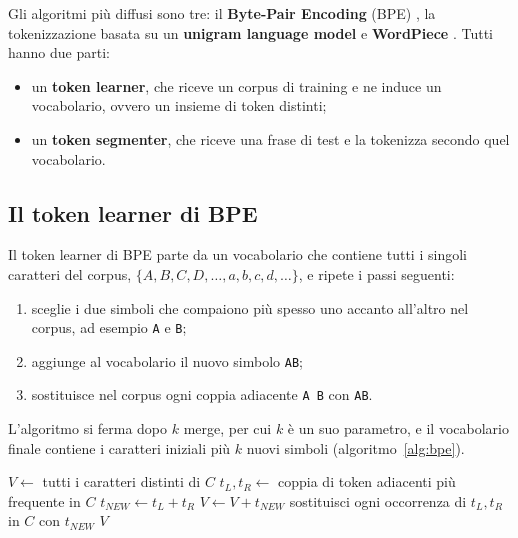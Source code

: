 Gli algoritmi più diffusi sono tre: il \textbf{Byte-Pair Encoding} (BPE) \cite{sennrich2016bpe}, la tokenizzazione basata su un \textbf{unigram language model} \cite{kudo2018unigram} e \textbf{WordPiece} \cite{schuster2012wordpiece}. Tutti hanno due parti:
\begin{itemize}
    \item un \textbf{token learner}, che riceve un corpus di training e ne induce un vocabolario, ovvero un insieme di token distinti;
    \item un \textbf{token segmenter}, che riceve una frase di test e la tokenizza secondo quel vocabolario.
\end{itemize}

\subsection{Il token learner di BPE}
Il token learner di BPE parte da un vocabolario che contiene tutti i singoli caratteri del corpus, $\{A, B, C, D, \dots, a, b, c, d, \dots\}$, e ripete i passi seguenti:
\begin{enumerate}
    \item sceglie i due simboli che compaiono più spesso uno accanto all'altro nel corpus, ad esempio \texttt{A} e \texttt{B};
    \item aggiunge al vocabolario il nuovo simbolo \texttt{AB};
    \item sostituisce nel corpus ogni coppia adiacente \texttt{A B} con \texttt{AB}.
\end{enumerate}
L'algoritmo si ferma dopo $k$ merge, per cui $k$ è un suo parametro, e il vocabolario finale contiene i caratteri iniziali più $k$ nuovi simboli (algoritmo~\ref{alg:bpe}).

\begin{algorithm}[htbp]
\caption{Il token learner di BPE.}
\label{alg:bpe}
\begin{algorithmic}[1]
  \State $V \gets$ tutti i caratteri distinti di $C$ 
   
    \State $t_L, t_R \gets$ coppia di token adiacenti più frequente in $C$
    \State $t_{NEW} \gets t_L + t_R$ 
    \State $V \gets V + t_{NEW}$ 
    \State sostituisci ogni occorrenza di $t_L, t_R$ in $C$ con $t_{NEW}$ 
  \EndFor
  \State \Return $V$
\EndFunction
\end{algorithmic}
\end{algorithm}

